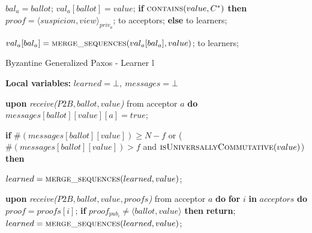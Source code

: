 \begin{algorithm}
\begin{algorithmic}[1]
		\State
		\State $bal_a = ballot$;
		\State $val_a[ballot] = value$;
		\State \textbf{if} $\Call{contains}{value, C^*}$ \textbf{then}
		\State \hspace{\algorithmicindent} $proof = \langle suspicion, view \rangle_{priv_a}$;
		\State \hspace{\algorithmicindent}  to acceptors;
		\State \textbf{else}
		\State \hspace{\algorithmicindent} to learners;
		\EndIf
		\EndFunction
		
		\State
		\State $val_a[bal_a] =  \Call{merge\_sequences}{val_a[bal_a], value}$;
		\State {} to learners;
		\EndIf
		\EndFunction
	\end{algorithmic}
\end{algorithm}

\begin{algorithm}
	\caption{Byzantine Generalized Paxos - Learner l}
	\label{BFT-Learn}
	\textbf{Local variables:} $learned = \bot,\ messages = \bot$ 
	\begin{algorithmic}[1]
		\State \textbf{upon} \textit{receive($P2B, ballot, value$)} from acceptor $a$ \textbf{do}
		\State \hspace{\algorithmicindent} $messages[ballot][value][a] = true$;
		\State \hspace{\algorithmicindent} \parbox{\linewidth}{\textbf{if} $\#(messages[ballot][value]) \geq N-f$ or ($\#(messages[ballot][value]) > f$ and $\Call{isUniversallyCommutative}{value}$) \textbf{then}}
		\State \hspace{\algorithmicindent}\hspace{\algorithmicindent} $learned = \Call{merge\_sequences}{learned, value}$;
		
		\State
		\State \textbf{upon} \textit{receive($P2B, ballot, value, proofs$)} from acceptor $a$ \textbf{do}
		\State \hspace{\algorithmicindent} \textbf{for} $i$ \textbf{in} $acceptors$ \textbf{do}
		\State \hspace{\algorithmicindent}\hspace{\algorithmicindent} $proof = proofs[i]$;
		\State \hspace{\algorithmicindent}\hspace{\algorithmicindent} \textbf{if} $proof_{pub_i} \neq \langle ballot, value \rangle$ \textbf{then}
		\State \hspace{\algorithmicindent}\hspace{\algorithmicindent}\hspace{\algorithmicindent} \textbf{return};
		\State \hspace{\algorithmicindent} $learned = \Call{merge\_sequences}{learned, value}$;
	\end{algorithmic}
\end{algorithm}
